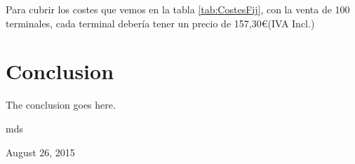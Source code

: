 \documentclass[10pt,journal,compsoc]{IEEEtran}
\begin{document}
Para cubrir los costes que vemos en la tabla \ref{tab:CostesFij}, con la venta de 100 terminales, 
cada terminal debería tener un precio de 157,30\euro (IVA Incl.)

\section{Conclusion}
The conclusion goes here.

\hfill mds
 
\hfill August 26, 2015

\end{document}
